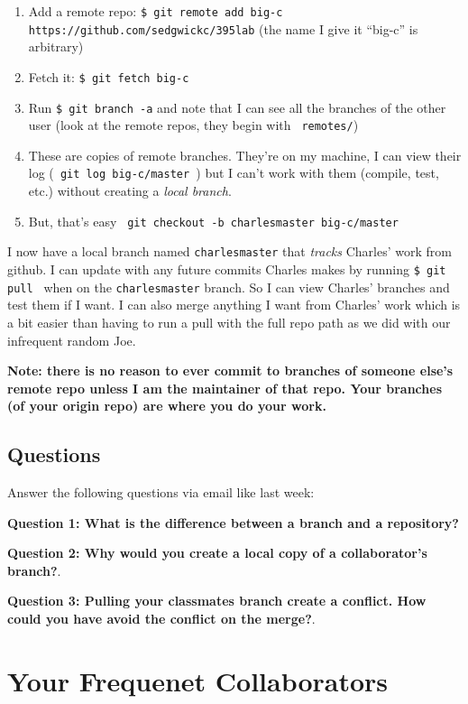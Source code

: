 \documentclass[letterpaper]{article}
\begin{document}
\begin{enumerate}
\item Add a remote repo: \verb+$ git remote add big-c https://github.com/sedgwickc/395lab+ (the name I give it ``big-c'' is arbitrary)
\item Fetch it: \verb+$ git fetch big-c +
\item Run \verb+$ git branch -a+ and note that I can see all the branches of the other user (look at the remote repos, they begin with \verb+ remotes/+)
\item These are copies of remote branches.  They're on my machine, I can view their log (\verb+ git log big-c/master +) but I can't work with them (compile, test, etc.) without creating a {\it local branch}.
\item But, that's easy \verb+ git checkout -b charlesmaster big-c/master+
\end{enumerate}

I now have a local branch named {\tt charlesmaster} that {\it tracks} Charles'
work from github.  I can update with any future commits Charles makes by
running \verb+$ git pull + when on the {\tt charlesmaster} branch.
So I can view Charles' branches and test them if I want.  
I can also merge anything I want from Charles' work which is a bit easier than having to run a pull with the full repo path as we did with our infrequent random Joe.

{\bf Note: there is no reason to ever commit to branches of someone else's
remote repo
unless I am the maintainer of that repo.  Your branches (of your origin repo) are where you do your
work.}

\subsection*{Questions}

Answer the following questions via email like last week:

{\bf Question 1: What is the difference between a branch and a repository?}


{\bf Question 2: Why would you create a local copy of a collaborator's branch?}.

{\bf Question 3: Pulling your classmates branch create a conflict.  How could you have avoid the conflict on the merge?}.

\section*{Your Frequenet Collaborators}
\end{document}
